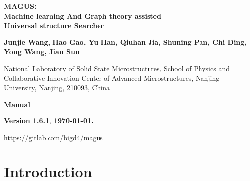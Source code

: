 \documentclass[12pt,oneside]{book}
\begin{document}

\begin{titlepage}

\begin{center}

\vspace{2.0cm}

\textbf{ 
\Large MAGUS: \vspace{0.7cm} \\
Machine learning And Graph theory assisted \vspace{0.5cm} \\
Universal structure Searcher}
\vspace{1.5cm}

\textbf{Junjie Wang, Hao Gao, Yu Han, Qiuhan Jia, Shuning Pan, Chi Ding, Yong Wang, Jian Sun}

\vspace{0.5cm}

National Laboratory of Solid State Microstructures,
School of Physics and Collaborative Innovation Center of Advanced Microstructures, Nanjing University, Nanjing, 210093, China

\vspace{0.5cm}

\vspace{2.0cm}

\textbf{\Large Manual}

\textbf{Version 1.6.1, \today.}

\vspace{2.0cm}

\textcolor{blue}{\url{https://gitlab.com/bigd4/magus}}

\end{center}

\vspace{1.0cm}

\end{titlepage}


\newpage
\setcounter{tocdepth}{4}
\tableofcontents

\newpage
\chapter{Introduction}
\end{document}
